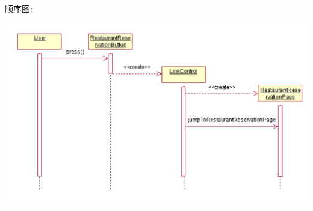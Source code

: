 \documentclass[11pt]{article}
\begin{document}
			顺序图: 
			\begin{center}
			\includegraphics[scale=0.42]{餐厅订位_顺序图.png}
			\end{center}
			
\end{document}
